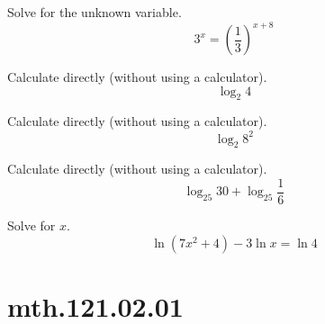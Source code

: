 \documentclass[12pt,addpoints, answers, fleqn]{exam}
\begin{document}
\begin{teacher}
\begin{questions}
Solve for the unknown variable.
\[
3^x = \left( \frac{1}{3} \right)^{x+8}
\]

\begin{solution}
\end{solution}

\question 	%

Calculate directly (without using a calculator).
\[
\log_2 4
\]

\begin{solution}
\end{solution}

\question 	%

Calculate directly (without using a calculator).
\[
\log_2 8^2
\]

\begin{solution}
\end{solution}

\question 	%


Calculate directly (without using a calculator).
\[
\log_{25} 30 + \log_{25} \frac{1}{6}
\]




\begin{solution}
\end{solution}

\question 	%

Solve for $x$.
\[
\ln \left(7x^2 + 4\right) - 3 \ln x = \ln 4
\]

\begin{solution}
\end{solution}

\end{questions}
\end{teacher}
\vfill
\pagebreak













\section{mth.121.02.01}
\end{document}
